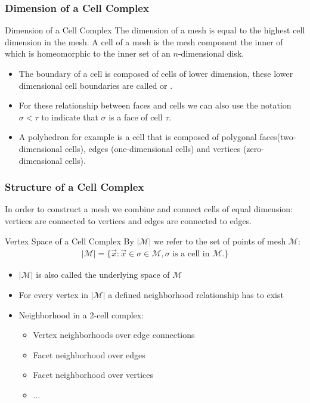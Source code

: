 \begin{frame}
  \frametitle{Dimension of a Cell Complex}
 	\begin{block}{Dimension of a Cell Complex}
	The dimension of a mesh is equal to the highest cell dimension in the mesh.
   A cell of a mesh is the mesh component the inner of which is homeomorphic to the inner set of an $n$-dimensional disk.  
	\end{block}
  \begin{itemize}
		\item The boundary of a cell is composed of cells of lower dimension, these lower dimensional cell boundaries are
 called  or .
		\item For these relationship between faces and cells we can also use the notation $\sigma < \tau$ to indicate that $\sigma$ is a face of cell $\tau$.
		\item A polyhedron for example is a cell that is composed of polygonal faces(two-dimensional cells), edges (one-dimensional cells) and vertices (zero-dimensional cells).
  \end{itemize}	
\end{frame}

\begin{frame}
  \frametitle{Structure of a Cell Complex}
In order to construct a mesh we combine and connect cells of equal dimension: vertices are connected to vertices and edges are connected to  edges. 
 	\begin{block}{Vertex Space of a Cell Complex}
By $|\mathcal M|$ we refer to the set of points of mesh $\mathcal M$:	
\begin{align*}
  |\mathcal M|=\{\vec{x} : \vec{x} \in \sigma \in \mathcal M, \text{$\sigma$ is a cell in $\mathcal M$.}\}  
\end{align*}
	\end{block}
  \begin{itemize}
		\item $|\mathcal M|$ is also called the underlying space of $\mathcal M$
		\item For every vertex in $|\mathcal M|$ a defined neighborhood relationship has to exist
		\item Neighborhood in a 2-cell complex:
		\begin{itemize}
			\item Vertex neighborhoods over edge connections
			\item Facet neighborhood over edges			
			\item Facet neighborhood over vertices
			\item ...									
		\end{itemize}				
  \end{itemize}		
\end{frame}

